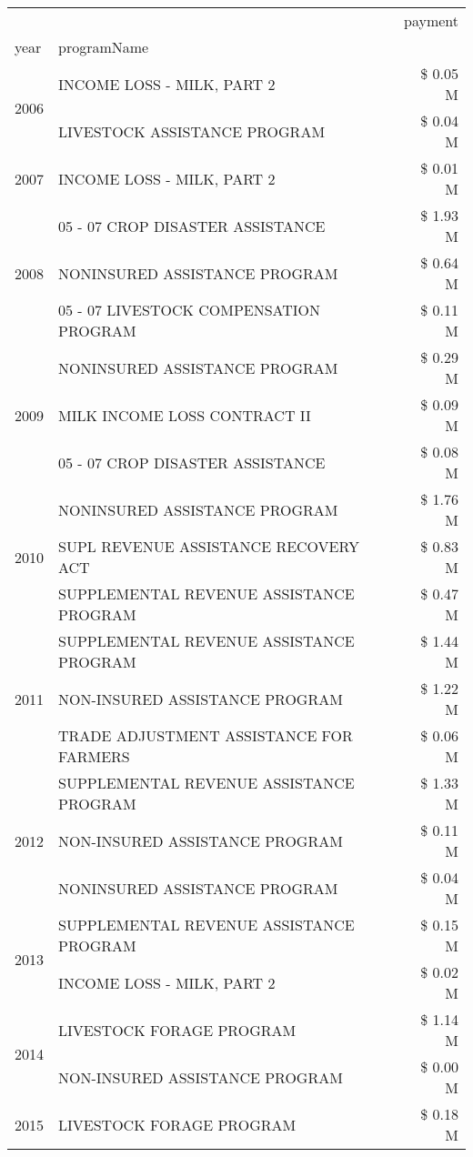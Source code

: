 \begin{tabular}{llr}
\toprule
 &  & payment \\
year & programName &  \\
\midrule
\multirow[t]{2}{*}{2006} & INCOME LOSS - MILK, PART 2 & \$ 0.05 M \\
 & LIVESTOCK ASSISTANCE PROGRAM & \$ 0.04 M \\
\cline{1-3}
2007 & INCOME LOSS - MILK, PART 2 & \$ 0.01 M \\
\cline{1-3}
\multirow[t]{3}{*}{2008} & 05 - 07 CROP DISASTER ASSISTANCE & \$ 1.93 M \\
 & NONINSURED ASSISTANCE PROGRAM & \$ 0.64 M \\
 & 05 - 07 LIVESTOCK COMPENSATION PROGRAM & \$ 0.11 M \\
\cline{1-3}
\multirow[t]{3}{*}{2009} & NONINSURED ASSISTANCE PROGRAM & \$ 0.29 M \\
 & MILK INCOME LOSS CONTRACT II & \$ 0.09 M \\
 & 05 - 07 CROP DISASTER ASSISTANCE & \$ 0.08 M \\
\cline{1-3}
\multirow[t]{3}{*}{2010} & NONINSURED ASSISTANCE PROGRAM & \$ 1.76 M \\
 & SUPL REVENUE ASSISTANCE RECOVERY ACT & \$ 0.83 M \\
 & SUPPLEMENTAL REVENUE ASSISTANCE PROGRAM & \$ 0.47 M \\
\cline{1-3}
\multirow[t]{3}{*}{2011} & SUPPLEMENTAL REVENUE ASSISTANCE PROGRAM & \$ 1.44 M \\
 & NON-INSURED ASSISTANCE PROGRAM & \$ 1.22 M \\
 & TRADE ADJUSTMENT ASSISTANCE FOR FARMERS & \$ 0.06 M \\
\cline{1-3}
\multirow[t]{3}{*}{2012} & SUPPLEMENTAL REVENUE ASSISTANCE PROGRAM & \$ 1.33 M \\
 & NON-INSURED ASSISTANCE PROGRAM & \$ 0.11 M \\
 & NONINSURED ASSISTANCE PROGRAM & \$ 0.04 M \\
\cline{1-3}
\multirow[t]{2}{*}{2013} & SUPPLEMENTAL REVENUE ASSISTANCE PROGRAM & \$ 0.15 M \\
 & INCOME LOSS - MILK, PART 2 & \$ 0.02 M \\
\cline{1-3}
\multirow[t]{2}{*}{2014} & LIVESTOCK FORAGE PROGRAM & \$ 1.14 M \\
 & NON-INSURED ASSISTANCE PROGRAM & \$ 0.00 M \\
\cline{1-3}
\multirow[t]{3}{*}{2015} & LIVESTOCK FORAGE PROGRAM & \$ 0.18 M \\

\end{tabular}
